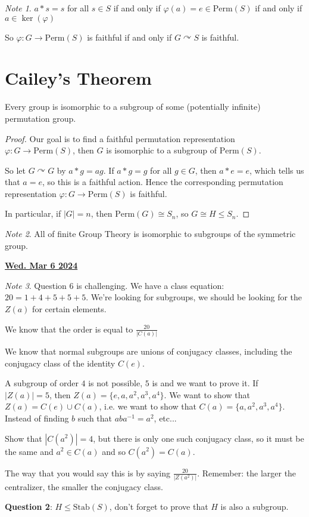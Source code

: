 \documentclass[12pt]{article}
\renewcommand{\date}[1]{\underline{\bf #1}}
\def\Stab{\text{Stab}}
\def\Perm{\text{Perm}}
\def\phi{\varphi}
\def\acts{\curvearrowright} %
\theoremstyle{remark}
\theoremstyle{remark}
\theoremstyle{remark}
\theoremstyle{remark}
\theoremstyle{remark}
\newtheorem*{note}{Note}
\begin{document}
\begin{note}
  $a * s = s$ for all $s \in S$ if and only if $\varphi(a) = e \in
  \Perm(S)$ if and only if $a \in \ker(\phi)$

  So $\varphi: G \to \Perm(S)$ is faithful if and only if $G \acts S$ is faithful.
\end{note}

\section{Cailey's Theorem}

Every group is isomorphic to a subgroup of some (potentially infinite)
permutation group.

\begin{proof}
  Our goal is to find a faithful permutation representation $\varphi:
  G \to \Perm(S)$, then $G$ is isomorphic to a subgroup of $\Perm(S)$.

  So let $G \acts G$ by $a * g = ag$. If $a * g = g$ for all $g \in G$, then $a *
  e = e$, which tells us that $a = e$, so this is a faithful action. Hence the
  corresponding permutation representation $\varphi: G \to \Perm(S)$ is faithful.

  In particular, if $|G| = n$, then $\Perm(G) \cong S_n$, so $G \cong H \le S_n$.
\end{proof}

\begin{note}
  All of finite Group Theory is isomorphic to subgroups of the symmetric group.
\end{note}

\date{Wed. Mar 6 2024}

\begin{note}
  Question 6 is challenging. We have a class equation: $20 = 1 + 4 + 5 + 5 + 5$.
  We're looking for subgroups, we should be looking for the $Z(a)$ for certain
  elements.

  We know that the order is equal to $\frac{20}{|C(a)|}$

  We know that normal subgroups are unions of conjugacy classes, including the
  conjugacy class of the identity $C(e)$.

  A subgroup of order $4$ is not possible, $5$ is and we want to prove it. If
  $|Z(a)| = 5$, then $Z(a) = \{e, a, a^2, a^3, a^4 \}$. We want to show that
  $Z(a) = C(e) \cup C(a)$, i.e. we want to show that $C(a) = \{a, a^2, a^3,
  a^4\}$. Instead of finding $b$ such that $aba^{-1} = a^2$, etc...

  Show that $|C(a^2)| = 4$, but there is only one such conjugacy class, so it
  must be the same and $a^2 \in C(a)$ and so $C(a^2) = C(a)$.

  The way that you would say this is by saying $\frac{20}{|Z(a^2)|}$. Remember:
  the larger the centralizer, the smaller the conjugacy class.

  {\bf Question 2}: $H \le \Stab(S)$, don't forget to prove that $H$ is also a
  subgroup.
\end{note}
\end{document}
